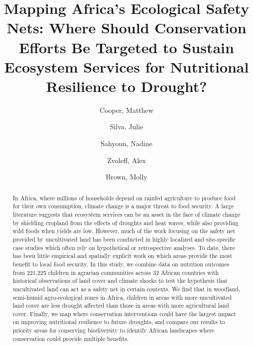 \documentclass[titlepage]{article}
\begin{document}
\title{Mapping Africa's Ecological Safety Nets: Where Should Conservation Efforts Be Targeted to Sustain Ecosystem Services for Nutritional Resilience to Drought?}

\author[1,2,*]{Cooper, Matthew}
\author[2]{Silva, Julie}
\author[3]{Sahyoun, Nadine}
\author[4]{Zvoleff, Alex}
\author[2]{Brown, Molly}


\maketitle
\begin{abstract}

In Africa, where millions of households depend on rainfed agriculture to produce food for their own consumption, climate change is a major threat to food security.  A large literature suggests that ecosystem services can be an asset in the face of climate change by shielding cropland from the effects of droughts and heat waves, while also providing wild foods when yields are low.  However, much of the work focusing on the safety net provided by uncultivated land has been conducted in highly localized and site-specific case studies which often rely on hypothetical or retrospective analyses.  To date, there has been little empirical and spatially explicit work on which areas provide the most benefit to local food security.  In this study, we combine data on nutrition outcomes from 221,225 children in agrarian communities across 32 African countries with historical observations of land cover and climate shocks to test the hypothesis that uncultivated land can act as a safety net in certain contexts.  We find that in woodland, semi-humid agro-ecological zones in Africa, children in areas with more uncultivated land cover are less drought affected than those in areas with more agricultural land cover.  Finally, we map where conservation interventions could have the largest impact on improving nutritional resilience to future droughts, and compare our results to priority areas for conserving biodiversity to identify African landscapes where conservation could provide multiple benefits.

\end{abstract}
\end{document}
